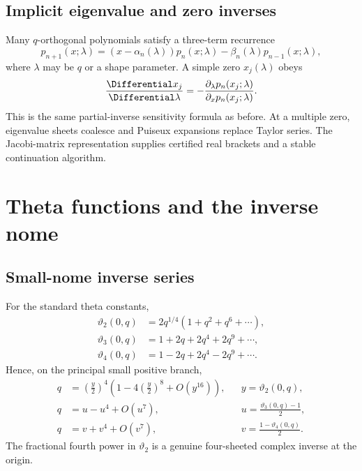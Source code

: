 \documentclass[11pt,letterpaper,oneside,openany]{book}
\theoremstyle{definition}
\theoremstyle{remark}
\begin{document}
\section{Implicit eigenvalue and zero inverses}
Many \(q\)-orthogonal polynomials satisfy a three-term recurrence
\[
 p_{n+1}(x;\lambda)=
 (x-\alpha_n(\lambda))p_n(x;\lambda)-\beta_n(\lambda)p_{n-1}(x;\lambda),
\]
where \(\lambda\) may be \(q\) or a shape parameter.  A simple zero
\(x_j(\lambda)\) obeys
\[
 \frac{\Differential x_j}{\Differential\lambda}
 =-\frac{\partial_\lambda p_n(x_j;\lambda)}
 {\partial_xp_n(x_j;\lambda)}.
\]
This is the same partial-inverse sensitivity formula as before.  At a multiple
zero, eigenvalue sheets coalesce and Puiseux expansions replace Taylor series.
The Jacobi-matrix representation supplies certified real brackets and a stable
continuation algorithm.

\chapter{Theta functions and the inverse nome}

\section{Small-nome inverse series}
For the standard theta constants,
\begin{align*}
 \vartheta_2(0,q)&=2q^{1/4}(1+q^2+q^6+\cdots),\\
 \vartheta_3(0,q)&=1+2q+2q^4+2q^9+\cdots,\\
 \vartheta_4(0,q)&=1-2q+2q^4-2q^9+\cdots.
\end{align*}
Hence, on the principal small positive branch,
\begin{align}
 q&=\left(\frac{y}{2}\right)^4
 \left(1-4\left(\frac{y}{2}\right)^8+O(y^{16})\right),
 &&y=\vartheta_2(0,q),
 \label{eq:theta2-inverse}\\
 q&=u-u^4+O(u^7),
 &&u=\frac{\vartheta_3(0,q)-1}{2},
 \label{eq:theta3-inverse}\\
 q&=v+v^4+O(v^7),
 &&v=\frac{1-\vartheta_4(0,q)}{2}.
 \label{eq:theta4-inverse}
\end{align}
The fractional fourth power in \(\vartheta_2\) is a genuine four-sheeted
complex inverse at the origin.
\end{document}
